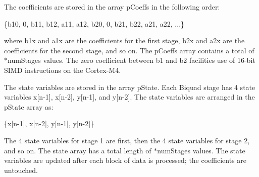 \begin{DoxyParagraph}{}
The coefficients are stored in the array {\ttfamily p\+Coeffs} in the following order\+: 
\begin{DoxyPre}
    \{b10, 0, b11, b12, a11, a12, b20, 0, b21, b22, a21, a22, ...\}
\end{DoxyPre}
 where {\ttfamily b1x} and {\ttfamily a1x} are the coefficients for the first stage, {\ttfamily b2x} and {\ttfamily a2x} are the coefficients for the second stage, and so on. The {\ttfamily p\+Coeffs} array contains a total of {$\ast$num\+Stages} values. The zero coefficient between {\ttfamily b1} and {\ttfamily b2} facilities use of 16-\/bit S\+I\+MD instructions on the Cortex-\/\+M4.
\end{DoxyParagraph}
\begin{DoxyParagraph}{}
The state variables are stored in the array {\ttfamily p\+State}. Each Biquad stage has 4 state variables {\ttfamily x\mbox{[}n-\/1\mbox{]}, x\mbox{[}n-\/2\mbox{]}, y\mbox{[}n-\/1\mbox{]},} and {\ttfamily y\mbox{[}n-\/2\mbox{]}}. The state variables are arranged in the {\ttfamily p\+State} array as\+: 
\begin{DoxyPre}
    \{x[n-1], x[n-2], y[n-1], y[n-2]\}
\end{DoxyPre}
 The 4 state variables for stage 1 are first, then the 4 state variables for stage 2, and so on. The state array has a total length of {$\ast$num\+Stages} values. The state variables are updated after each block of data is processed; the coefficients are untouched. 
\end{DoxyParagraph}
